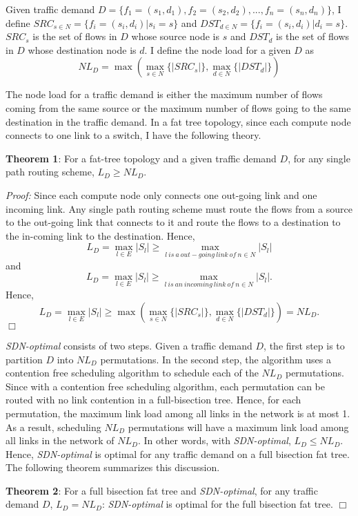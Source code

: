 Given traffic demand
$D = \{f_1=(s_1, d_1), f_2=(s_2, d_2), ..., f_n = (s_n, d_n)\}$, I define
$SRC_{s\in N} = \{f_i = (s_i, d_i) | s_i = s\}$ and $DST_{d\in N} =
\{f_i = (s_i, d_i) | d_i = s\}$.  $SRC_s$ is the set of flows in $D$ whose
source node is $s$ and $DST_d$ is the set of flows in $D$ whose destination
node is $d$. I define the node load for a given $D$ as 
\[NL_D = \max(\max_{s \in N} \{|SRC_s|\}, \max_{d \in N} \{|DST_d|\})\]

The node load for a traffic demand is either the maximum number of flows
coming from the same source or the maximum number of flows going to
the same destination in the traffic demand. In a fat tree topology, since
each compute node connects to one link to a switch, I have the following
theory.

{\bf Theorem 1}: For a fat-tree topology and a given traffic demand $D$,
for any single path routing scheme, $L_D \ge NL_D$.

{\em Proof:} Since each compute
node only connects one out-going link and one incoming link. Any single path
routing scheme must route the flows from a source to the out-going link that
connects to it and route the flows to a destination to the in-coming link
to the destination. Hence,
\[L_D = \max_{l\in E} {|S_l|} \ge \max_{l\ is\ a\ out-going\ link\ of\ n\in N} {|S_l|}\] and 
\[L_D = \max_{l\in E} {|S_l|} \ge \max_{l\ is\ an\ incoming\ link\ of\ n\in N} {|S_l|}.\]
Hence, 
\[L_D = \max_{l\in E} {|S_l|} \ge \max(\max_{s \in N} \{|SRC_s|\}, \max_{d \in N} \{|DST_d|\}) = NL_D.\] $\Box$

\textit{SDN-optimal} consists of two steps. Given a traffic demand $D$,
the first step is to partition $D$ into $NL_D$ permutations. In the second
step, the algorithm uses a contention free scheduling algorithm to schedule
each of the $NL_D$ permutations. Since with a contention free scheduling
algorithm, each permutation can be routed with no link contention in a
full-bisection tree. Hence, for each permutation, the maximum link load among
all links in the network
is at most 1. As a result, scheduling $NL_D$ permutations will
have a maximum link load among all links in the network of $NL_D$. In other
words, with \textit{SDN-optimal}, $L_D \le NL_D$. Hence, \textit{SDN-optimal}
is optimal for any traffic demand on a full bisection fat tree. The following
theorem summarizes this discussion. 

{\bf Theorem 2}: For a full bisection fat tree and
\textit{SDN-optimal}, for any traffic demand $D$, $L_D = NL_D$:
\textit{SDN-optimal} is optimal for the full bisection fat tree. 
$\Box$

